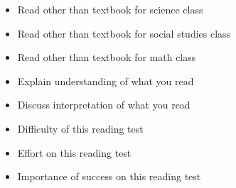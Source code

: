 \begin{singlespace}
\begin{itemize}
	\item Read other than textbook for science class
	\item Read other than textbook for social studies class
	\item Read other than textbook for math class
	\item Explain understanding of what you read
	\item Discuss interpretation of what you read
	\item Difficulty of this reading test
	\item Effort on this reading test
	\item Importance of success on this reading test
\end{itemize}

\end{singlespace}


